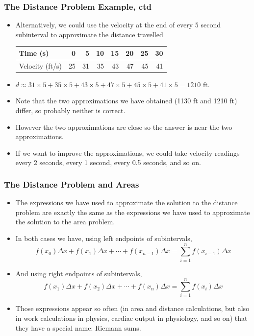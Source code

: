 \documentclass[serif,ignorenonframetext]{beamer}
\begin{document}
\begin{frame}
  \frametitle{The Distance Problem Example, ctd}
  \begin{itemize}[<+->]
  \item Alternatively, we could use the velocity at the end of every 5
    second subinterval to approximate the distance travelled
    \begin{tabular}{|l|r|r|r|r|r|r|r|}
      \hline
      Time (s)        &  0 &  5 & 10 & 15 & 20 & 25 & 30 \\
      \hline
      Velocity (ft/s) & 25 & 31 & 35 & 43 & 47 & 45 & 41 \\
      \hline
    \end{tabular}
  \item
    $d\approx 31\times 5 + 35\times 5 + 43\times 5 + 47\times 5 +
    45\times 5 + 41\times 5 = 1210$ ft.
  \item Note that the two approximations we have obtained (1130 ft and
    1210 ft) differ, so probably neither is correct.
  \item However the two approximations are close so the answer is near
    the two approximations.
  \item If we want to improve the approximations, we could take
    velocity readings every 2 seconds, every 1 second, every 0.5
    seconds, and so on.
  \end{itemize}
\end{frame}

\begin{frame}
  \frametitle{The Distance Problem and Areas}
  \begin{itemize}[<+->]
  \item The expressions we have used to approximate the solution to
    the distance problem are exactly the same as the expressions we
    have used to approximate the solution to the area problem.
  \item In both cases we have, using left endpoints of subintervals,
    \begin{displaymath}
      f(x_0) \Delta x + f(x_1) \Delta x + \cdots + f(x_{n-1}) \Delta x
      = \sum_{i=1}^{n} f(x_{i-1}) \Delta x
    \end{displaymath}
  \item And using right endpoints of subintervals,
    \begin{displaymath}
      f(x_1) \Delta x + f(x_2) \Delta x + \cdots + f(x_n) \Delta x
      = \sum_{i=1}^{n} f(x_{i}) \Delta x
    \end{displaymath}
  \item Those expressions appear so often (in area and distance
    calculations, but also in work calculations in physics, cardiac
    output in physiology, and so on) that they have a special name:
    Riemann sums.
  \end{itemize}
\end{frame}
\end{document}
